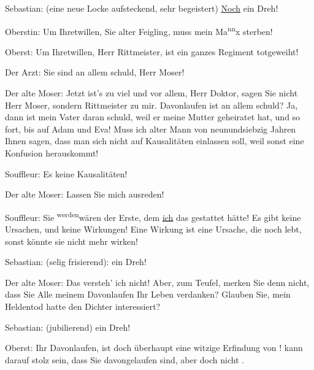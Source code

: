 \pstart
           Sebastian: (eine neue Locke aufsteckend, sehr begeistert) \uline{Noch} ein Dreh!\pend
           
\pstart
           Oberstin: Um Ihretwillen, Sie alter Feigling, muss mein Ma\substVorne{}\textsuperscript{nn}\substDazwischen{}x\substHinten{} sterben!\pend
           
\pstart
           Oberst: Um Ihretwillen, Herr Rittmeister, ist ein ganzes Regiment totgeweiht!\pend
           
\pstart
           Der Arzt: Sie sind an allem schuld, Herr Moser!\pend
           
\pstart
           Der alte Moser: Jetzt ist’s zu viel und vor allem, Herr Doktor, sagen Sie nicht Herr
               Moser, sondern Rittmeister zu mir.  Davonlaufen ist an
               allem schuld? Ja, {\pb}dann ist mein
               Vater daran schuld, weil er meine Mutter geheiratet hat, und so fort, bis auf Adam
               und Eva! Muss ich alter Mann von neunundsiebzig Jahren Ihnen sagen, dass man sich
               nicht auf Kausalitäten einlassen soll, weil sonst eine Konfusion herauskommt!\pend
           
\pstart
           Souffleur: Es  keine Kausalitäten!\pend
           
\pstart
           Der alte Moser: Lassen Sie mich ausreden!\pend
           
\pstart
           Souffleur: Sie \substVorne{}\textsuperscript{werden}{\allowbreak}\substDazwischen{}wären\substHinten{} der Erste, dem \uline{ich} das gestattet hätte! Es
               gibt keine Ursachen, und keine Wirkungen! Eine Wirkung ist eine Ursache, die noch
               lebt, sonst könnte sie nicht mehr wirken!\pend
           
\pstart
           Sebastian: (selig frisierend):  ein Dreh!\pend
           
\pstart
           Der alte Moser: Das versteh’ ich nicht! Aber, zum Teufel, merken Sie denn nicht, dass
               Sie Alle meinem Davonlaufen Ihr Leben verdanken? Glauben Sie, mein Heldentod hatte
               den Dichter interessiert?\pend
           
\pstart
           Sebastian: (jubilierend)  ein Dreh!\pend
           
\pstart
           Oberst: Ihr Davonlaufen, ist doch überhaupt eine witzige Erfindung von !  kann darauf stolz sein,
               dass Sie davongelaufen sind, aber doch nicht .\pend
           
